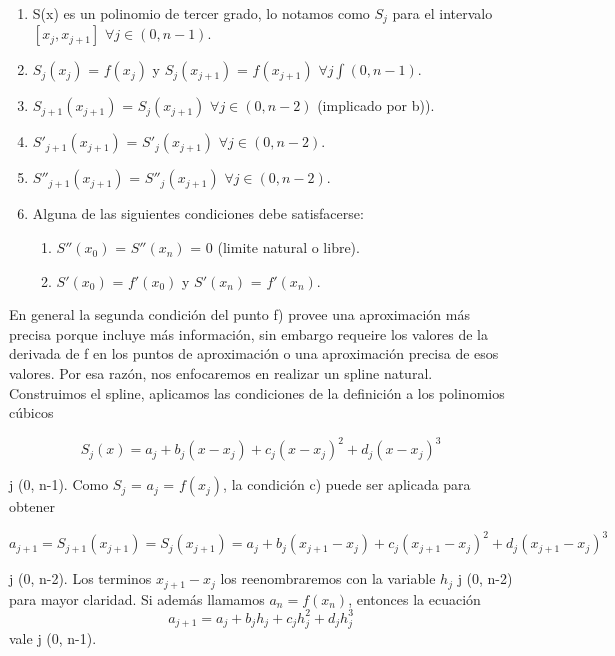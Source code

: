 \begin{enumerate}
\item  S(x) es un polinomio de tercer grado, lo notamos como $S_{j}$ para el intervalo $[x_{j},x_{j+1}]$ $\forall j \in (0, n-1)$.
\item $S_{j}(x_{j})$ = $f(x_{j})$  y $S_{j}(x_{j+1})$ = $f(x_{j+1})$ $\forall j \int (0, n-1)$.
\item $S_{j+1}(x_{j+1})$ = $S_{j}(x_{j+1})$ $\forall j \in (0, n-2)$ (implicado por b)).
\item $S'_{j+1}(x_{j+1})$ = $S'_{j}(x_{j+1})$ $\forall j \in (0, n-2)$.
\item $S''_{j+1}(x_{j+1})$ = $S''_{j}(x_{j+1})$ $\forall j \in (0, n-2)$.
\item Alguna de las siguientes condiciones debe satisfacerse:
  \begin{enumerate}
  \item $S''(x_{0})$ = $S''(x_{n})$ = 0 (limite natural o libre).
  \item $S'(x_{0})$ = $f'(x_{0})$ y $S'(x_{n})$ = $f'(x_{n})$.
  \end{enumerate}
\end{enumerate}

En general la segunda condición del punto f) provee una aproximación más precisa porque incluye más información, sin embargo requeire los valores de la derivada de f en los puntos de aproximación o una aproximación precisa de esos valores. Por esa razón, nos enfocaremos en realizar un spline natural.\\

Construimos el spline, aplicamos las condiciones de la definición a los polinomios cúbicos

$$S_{j}(x) = a_{j} + b_{j} (x - x_{j}) + c_{j} (x - x_{j})^{2} + d_{j} (x - x_{j})^{3}$$

\forall j \in (0, n-1). Como $S_{j}$ = $a_{j}$ = $f(x_{j})$, la condición c) puede ser aplicada para obtener

$$ a_{j+1} = S_{j+1}(x_{j+1}) = S_{j}(x_{j+1}) = a_{j} + b_{j} (x_{j+1} - x_{j}) + c_{j} (x_{j+1} - x_{j})^{2} + d_{j} (x_{j+1} - x_{j})^{3}$$

\forall j \in (0, n-2). Los terminos $ x_{j+1} - x_{j} $ los reenombraremos con la variable $h_{j}$ \forall j \in (0, n-2) para mayor claridad. Si además llamamos $a_{n} = f(x_{n})$, entonces la ecuación
$$a_{j+1} = a_{j} + b_{j} h_{j} + c_{j} h_{j}^{2} + d_{j} h_{j}^{3} $$
vale \forall j \in (0, n-1).

